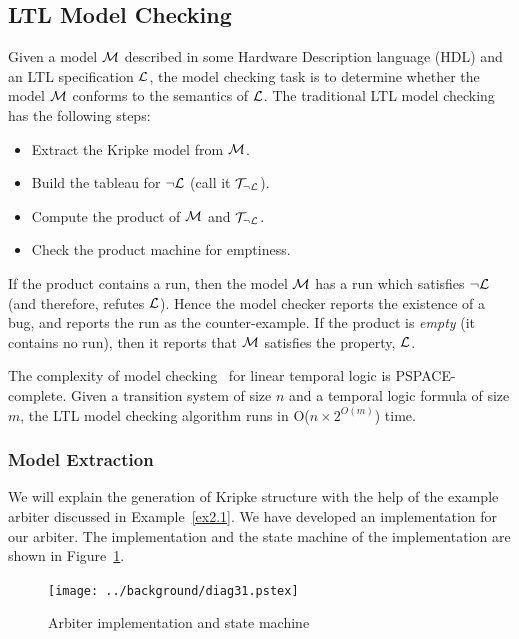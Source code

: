 \subsection{LTL Model Checking}
Given a model ${\cal M}$ described in some Hardware Description language (HDL) 
and an LTL specification ${\cal L}$, the model checking task is to 
determine whether the model ${\cal M}$ conforms to the semantics of ${\cal L}$. 
The traditional LTL model checking~\cite{lichtenstein:85} has the 
following steps:

\begin{itemize}
\item Extract the Kripke model from ${\cal M}$.

\item Build the tableau for $\lnot{\cal L}$ (call it 
						${\cal T}_{\lnot{\cal L}}$).

\item Compute the product of ${\cal M}$ and ${\cal T}_{\lnot{\cal L}}$.

\item Check the product machine for emptiness.

\end{itemize}

\noindent
If the product contains a run, then the model ${\cal M}$ has a run which 
satisfies $\lnot{\cal L}$ (and therefore, refutes ${\cal L}$). Hence the model 
checker reports the existence of a bug, and reports the run as the 
counter-example. If the product is {\em empty} (it contains no run), then it 
reports that ${\cal M}$ satisfies the property, ${\cal L}$.

\noindent
The complexity of model checking~\cite{schnoebelen:02} for 
linear temporal logic is PSPACE-complete. Given a transition 
system of size 	$n$ and a temporal logic formula of size $m$, 
the LTL model checking algorithm runs in O($n\times2^{O(m)}$) time.

\subsubsection{Model Extraction}
We will explain the generation of Kripke structure with the help of the example
arbiter discussed in Example~\ref{ex2.1}.
We have developed an implementation for our arbiter. The implementation and
the state machine of the implementation are shown in Figure~\ref{fig2.4}. 

\begin{figure}[htb]
\centering
\texttt{[image: ../background/diag31.pstex]}
\caption{Arbiter implementation and state machine} \label{fig2.4}
\end{figure}

